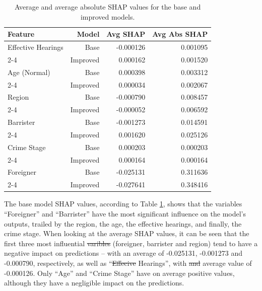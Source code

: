 \documentclass[fleqn,10pt]{wlscirep}
\providecommand{\DIFadd}[1]{{\protect\color{blue}\uwave{#1}}} %
\providecommand{\DIFdel}[1]{{\protect\color{red}\sout{#1}}}                      %
\providecommand{\DIFaddbegin}{} %
\providecommand{\DIFaddend}{} %
\providecommand{\DIFdelbegin}{} %
\providecommand{\DIFdelend}{} %
\begin{document}
\begin{table}[h!]
\centering
\begin{tabular}{|l|r|r|r|}
\hline
\textbf{Feature} & \textbf{Model} & \textbf{Avg SHAP} & \textbf{Avg Abs SHAP} \\ \hline
Effective Hearings & Base      & -0.000126 &  0.001095  \\ \cline{2-4}
                   & Improved  &  0.000162 &   0.001520  \\ \hline
Age (Normal)         & Base      &  0.000398 &  0.003312  \\ \cline{2-4}
                   & Improved  &  0.000034 &  0.002067  \\ \hline
Region             & Base      &  -0.000790 &  0.008457  \\ \cline{2-4}
                   & Improved  &  -0.000052 &  0.006592  \\ \hline
Barrister          & Base      & -0.001273 &  0.014591  \\ \cline{2-4}
                   & Improved  &  0.001620 &  0.025126  \\ \hline
Crime Stage        & Base      &  0.000203 &  0.000203 \\ \cline{2-4}
                   & Improved  &  0.000164 &  0.000164  \\ \hline
Foreigner          & Base      & -0.025131 &  0.311636  \\ \cline{2-4}
                   & Improved  &  -0.027641 &  0.348416  \\ \hline
\end{tabular}
\caption{Average and average absolute SHAP values for the base and improved models.}
\label{tab:dt_shap_stats_base_improved}
\end{table}

The base model SHAP values, according to Table \ref{tab:dt_shap_stats_base_improved}, shows that the variables ``Foreigner'' and ``Barrister'' have the most significant influence on the model's outputs, trailed by the region, the age, the effective hearings, and finally, the crime stage. When looking at the average SHAP values, it can be seen that the first three most influential \DIFdelbegin \DIFdel{varibles }\DIFdelend \DIFaddbegin \DIFadd{variables }\DIFaddend (foreigner, barrister and region) tend to have a negative impact on predictions -- with an average of -0.025131, -0.001273 and -0.000790, respectively, as well as ``\DIFdelbegin \DIFdel{Effecive }\DIFdelend \DIFaddbegin \DIFadd{Effective }\DIFaddend Hearings'', with \DIFdelbegin \DIFdel{and }\DIFdelend \DIFaddbegin \DIFadd{an }\DIFaddend average value of -0.000126. Only ``Age'' and ``Crime Stage'' have on average positive values, although they have a negligible impact on the predictions.
\end{document}
